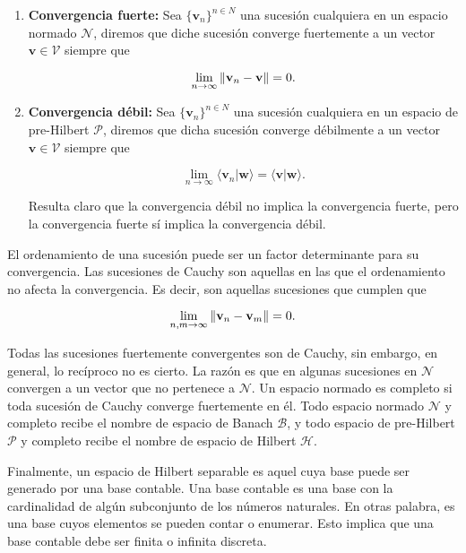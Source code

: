 \begin{enumerate}
    \item \textbf{Convergencia fuerte:} Sea $\{\mathbf{v}_n\}^{n \in N}$ una sucesión cualquiera en un espacio normado $\mathcal{N}$, diremos que diche sucesión converge fuertemente a un vector $\mathbf{v} \in \mathcal{V}$ siempre que

        \begin{equation}
            \lim_{n \to \infty} \norm{\mathbf{v}_n - \mathbf{v}} = 0 .
        \end{equation}

    \item \textbf{Convergencia débil:} Sea $\{\mathbf{v}_n\}^{n \in N}$ una sucesión cualquiera en un espacio de pre-Hilbert $\mathcal{P}$, diremos que dicha sucesión converge débilmente a un vector $\mathbf{v} \in \mathcal{V}$ siempre que

        \begin{equation}
            \lim_{n \to \infty} \langle \mathbf{v}_n | \mathbf{w} \rangle = \langle \mathbf{v} | \mathbf{w} \rangle .
        \end{equation}

        Resulta  claro que la convergencia débil no implica la convergencia fuerte, pero la convergencia fuerte sí implica la convergencia débil.
\end{enumerate}

El ordenamiento de una sucesión puede ser un factor determinante para su convergencia. Las sucesiones de Cauchy son aquellas en las que el ordenamiento no afecta la convergencia. Es decir, son aquellas sucesiones que cumplen que

\begin{equation}
    \lim_{n,m \to \infty} \norm{\mathbf{v}_n - \mathbf{v}_m} = 0 .
\end{equation}

Todas las sucesiones fuertemente convergentes son de Cauchy, sin embargo, en general, lo recíproco no es cierto. La razón es que en algunas sucesiones en $\mathcal{N}$ convergen a un vector que no pertenece a $\mathcal{N}$. Un espacio normado es completo si toda sucesión de Cauchy converge fuertemente en él. Todo espacio normado $\mathcal{N}$ y completo recibe el nombre de espacio de Banach $\mathcal{B}$, y todo espacio de pre-Hilbert $\mathcal{P}$ y completo recibe el nombre de espacio de Hilbert $\mathcal{H}$.

Finalmente, un espacio de Hilbert separable es aquel cuya base puede ser generado por una base contable. Una base contable es una base con la cardinalidad de algún subconjunto de los números naturales. En otras palabra, es una base cuyos elementos se pueden contar o enumerar. Esto implica que una base contable debe ser finita o infinita discreta.

